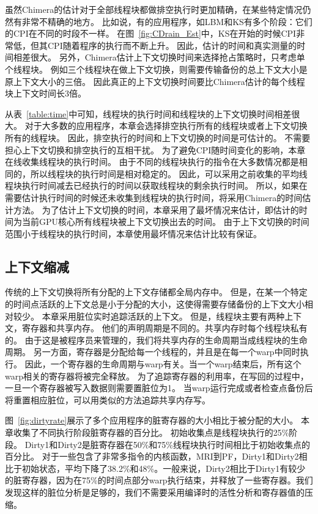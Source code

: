 虽然Chimera的估计对于全部线程块都做排空执行时更加精确，在某些特定情况仍然有非常不精确的地方。
比如说，有的应用程序，如LBM和KS有多个阶段：它们的CPI在不同的时段不一样。
在图~\ref{fig:CDrain_Est}中，KS在开始的时候CPI非常低，但其CPI随着程序的执行而不断上升。
因此，估计的时间和真实测量的时间相差很大。
另外，Chimera估计上下文切换时间来选择抢占策略时，只考虑单个线程块。
例如三个线程块在做上下文切换，则需要传输备份的总上下文大小是原上下文大小的三倍。
因此真正的上下文切换时间要比Chimera估计的每个线程块上下文时间长3倍。

从表~\ref{table:time}中可知，线程块的执行时间和线程块的上下文切换时间相差很大。
对于大多数的应用程序，本章会选择排空执行所有的线程块或者上下文切换所有的线程块。
因此，排空执行的时间和上下文切换的时间是可估计的。
不需要担心上下文切换和排空执行的互相干扰。
为了避免CPI随时间变化的影响，本章在线收集线程块的执行时间。
由于不同的线程块执行的指令在大多数情况都是相同的，所以线程块的执行时间是相对稳定的。
因此，可以采用之前收集的平均线程块执行时间减去已经执行的时间以获取线程块的剩余执行时间。
所以，如果在需要估计执行时间的时候还未收集到线程块的执行时间，将采用Chimera的时间估计方法。
为了估计上下文切换的时间，本章采用了最坏情况来估计，即估计的时间为当前GPU核心所有线程块被上下文切换出去的时间。
由于上下文切换的时间范围小于线程块的执行时间，本章使用最坏情况来估计比较有保证。


\subsection{上下文缩减}
传统的上下文切换将所有分配的上下文存储都全局内存中。
但是，在某一个特定的时间点活跃的上下文总是小于分配的大小，这使得需要存储备份的上下文大小相对较少。
本章采用脏位实时追踪活跃的上下文。
但是，线程块主要有两种上下文，寄存器和共享内存。
他们的声明周期是不同的。共享内存时每个线程块私有的。
由于这是被程序员来管理的，我们将共享内存的生命周期当成线程块的生命周期。
另一方面，寄存器是分配给每一个线程的，并且是在每一个warp中同时执行。
因此，一个寄存器的生命周期与warp有关。当一个warp结束后，所有这个warp相关的寄存器将被完全释放。
为了追踪寄存器的利用率，在写回的过程中，一旦一个寄存器被写入数据则需要置脏位为1。
当warp运行完成或者检查点备份后将重置相应脏位，可以用类似的方法追踪共享内存写。

图~\ref{fig:dirtyrate}展示了多个应用程序的脏寄存器的大小相比于被分配的大小。
本章收集了不同执行阶段脏寄存器的百分比。
初始收集点是线程块执行的25\%阶段。
Dirty1和Dirty2是脏寄存器在50\%和75\%线程块执行时间相比于初始收集点的百分比。
对于一些包含了非常多指令的内核函数，MRI到PF，Dirty1和Dirty2相比于初始状态，平均下降了38.2\%和48\%。一般来说，Dirty2相比于Dirty1有较少的脏寄存器，因为在75\%的时间点部分warp执行结束，并释放了一些寄存器。我们发现这样的脏位分析是足够的，我们不需要采用编译时的活性分析和寄存器值的压缩。

